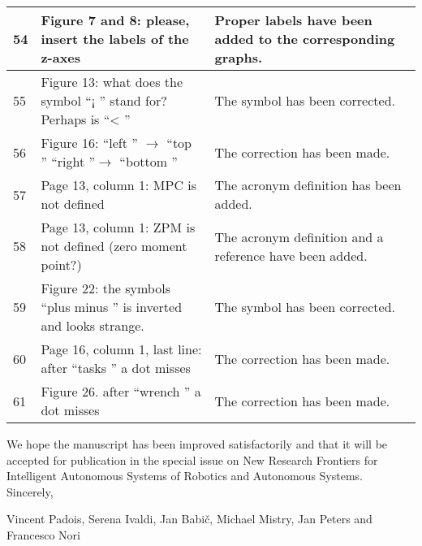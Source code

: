 \documentclass[12pt,a4paper]{article}
\begin{document}
\begin{longtable}[!h]{|p{0.3cm}|p{8.5cm}||p{9cm}|}
54	& Figure 7 and 8: please, insert the labels of the z-axes & Proper labels have been added to the corresponding graphs.\tabularnewline \hline
55	& Figure 13: what does the symbol  ``¡ '' stand for? Perhaps is  ``< '' & The symbol has been corrected.\tabularnewline \hline
56	& Figure 16:  ``left '' $\rightarrow$  ``top ''   ``right ''$\rightarrow$ ``bottom '' & The correction has been made.\tabularnewline \hline
57	& Page 13, column 1: MPC is not defined & The acronym definition has been added.\tabularnewline \hline
58	& Page 13, column 1: ZPM is not defined (zero moment point?) & The acronym definition and a reference have been added.\tabularnewline \hline
59	& Figure 22: the symbols  ``plus minus '' is inverted and looks strange. & The symbol has been corrected. \tabularnewline \hline
60	& Page 16, column 1, last line: after  ``tasks '' a dot misses & The correction has been made. \tabularnewline \hline
61	& Figure 26. after  ``wrench '' a dot misses & The correction has been made. \tabularnewline \hline
\end{longtable}


We hope the manuscript has been improved satisfactorily and that it will be accepted for publication in the special issue on New Research Frontiers for Intelligent Autonomous Systems of Robotics and Autonomous Systems.\\

Sincerely,

Vincent Padois, Serena Ivaldi, Jan Babi\v{c}, Michael Mistry, Jan Peters and Francesco Nori
\end{document}
